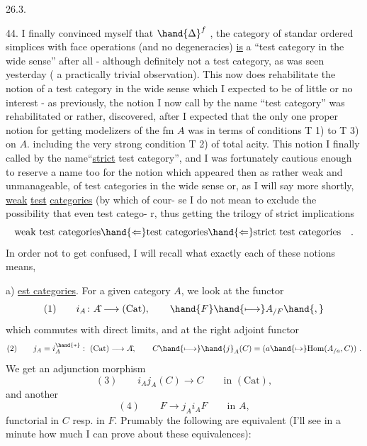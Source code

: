 
26.3.

44. I finally convinced myself that $\hand{\Delta}^{f}$ , the category of standar
ordered simplices with face operations (and no degeneracies) \uline{is} a ``test
category in the wide sense'' after all - although definitely not a test
category, as was seen yesterday ( a practically trivial observation).
This now does rehabilitate the notion of a test category in the wide sense\hand{,}
which I expected to be of little or no interest -  as previously, the
notion I now call by the name ``test category'' was rehabilitated or rather,
discovered, after I expected that the only one proper notion for getting
modelizers of the fm $A\hat{}$ was in terms of conditions T 1) to T 3) on $A$.
\hand{(}including the very strong condition T 2) of total acity\hand{)}. This notion
I  finally called by the name``\uline{strict} test category'', and I was fortunately
cautious enough to reserve a name too for the notion which appeared then
as rather weak and  unmanageable, of test categories in the wide sense
or, as I will say  more shortly, \uline{weak} \uline{test} \uline{categories} (by which of cour-%
se I do not mean to exclude the possibility that    even  test catego-%
r\hand{)}, thus getting the trilogy of  strict implications
\[ \text{weak test categories} \hand{\Leftarrow} \text{test categories} \hand{\Leftarrow} \text{strict test categories} \quad . \]
In order not to get confused, I will recall what exactly each of these
notions means,

a)  \uline{est categories}.  For a given  category $A$,
we look at the functor
\[ (1) \qquad i_A\colon A\hat{} \longrightarrow (\mathrm{Cat}) , \qquad \hand{F} \hand{\longmapsto} A_{/F} \hand{,} \]
which commutes with direct limits, and at the right adjoint functor
\[ (2) \qquad j_A = i_A^{\hand{*}} : \ (\mathrm{Cat}) \longrightarrow A\hat{}, \qquad C \hand{\longmapsto} \hand{j}_A(C) = (a \hand{\mapsto} \mathrm{Hom}(A_{/a},C)) \ . \]
We get an adjunction  morphism
\[ (3) \qquad i_A j_A(C) \longrightarrow C \qquad \text{in } (\mathrm{Cat}) , \]
and another
\[ (4) \qquad F \longrightarrow j_A i_A F \qquad \text{in } A\hat{} , \]
functorial in $C$ resp. in $F$. Prumably the following are equivalent
(I'll see in a minute how much I can prove about these equivalences):

